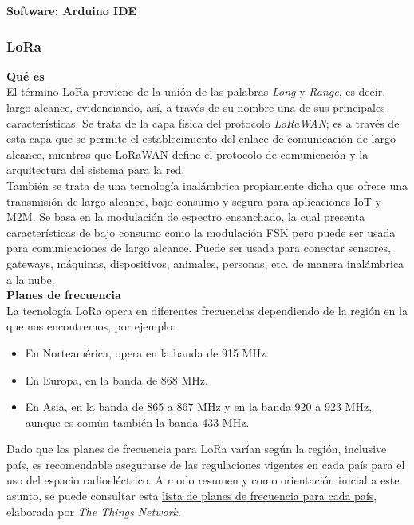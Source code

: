 \documentclass[12pt]{article}
\begin{document}
	\noindent \textbf{\large Software: Arduino IDE}
	
	
	\subsubsection[LoRa]{LoRa}
	
	\noindent \textbf{Qué es}\\
	
	\noindent El término LoRa proviene de la unión de las palabras \textit{Long} y \textit{Range}, es decir, largo alcance, evidenciando, así, a través de su nombre una de sus principales características. Se trata de la capa física del protocolo \textit{LoRaWAN}; es a través de esta capa que se permite el establecimiento del enlace de comunicación de largo alcance, mientras que LoRaWAN define el protocolo de comunicación y la arquitectura del sistema para la red. \\
	
	\noindent También se trata de una tecnología inalámbrica propiamente dicha que ofrece una transmisión de largo alcance, bajo consumo y segura para aplicaciones IoT y M2M. Se basa en la modulación de espectro ensanchado, la cual presenta características de bajo consumo como la modulación FSK pero puede ser usada para comunicaciones de largo alcance. Puede ser usada para conectar sensores, gateways, máquinas, dispositivos, animales, personas, etc. de manera inalámbrica a la nube.\\
	
	\noindent \textbf{Planes de frecuencia} \\
	
	\noindent La tecnología LoRa opera en diferentes frecuencias dependiendo de la región en la que nos encontremos, por ejemplo: \\
	
	\begin{itemize}
		\item En Norteamérica, opera en la banda de 915 MHz.
		\item En Europa, en la banda de 868 MHz.
		\item En Asia, en la banda de 865 a 867 MHz y en la banda 920 a 923 MHz, aunque es común también la banda 433 MHz.
	\end{itemize}
	
	\noindent Dado que los planes de frecuencia para LoRa varían según la región, inclusive país, es recomendable asegurarse de las regulaciones vigentes en cada país para el uso del espacio radioeléctrico. A modo resumen y como orientación inicial a este asunto, se puede consultar esta \href{https://www.thethingsnetwork.org/docs/lorawan/frequencies-by-country/index.html}{lista de planes de frecuencia para cada país}, elaborada por \textit{The Things Network}. \\
	
\end{document}
